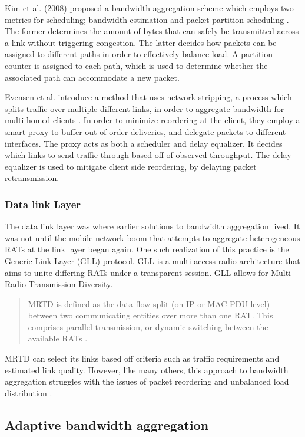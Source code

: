 \documentclass[12pt]{article}
\begin{document}
		Kim et al. (2008) proposed a bandwidth aggregation scheme which employs two metrics for scheduling; bandwidth estimation and packet partition scheduling \cite{kim2008packet}. The former determines the amount of bytes that can safely be transmitted across a link without triggering congestion. The latter decides how packets can be assigned to different paths in order to effectively balance load. A partition counter is assigned to each path, which is used to determine whether the associated path can accommodate a new packet.

		Evensen et al. introduce a method that uses network stripping, a process which splits traffic over multiple different links, in order to aggregate bandwidth for multi-homed clients \cite{5355198}. In order to minimize reordering at the client, they employ a smart proxy to buffer out of order deliveries, and delegate packets to different interfaces. The proxy acts as both a scheduler and delay equalizer. It decides which links to send traffic through based off of observed throughput. The delay equalizer is used to mitigate client side reordering, by delaying packet retransmission.

	\subsubsection{Data link Layer}
		The data link layer was where earlier solutions to bandwidth aggregation lived. It was not until the mobile network boom that attempts to aggregate heterogeneous RATs at the link layer began again. One such realization of this practice is the Generic Link Layer (GLL) protocol. GLL is a multi access radio architecture that aims to unite differing RATs under a transparent session. GLL allows for Multi Radio Transmission Diversity.
		\begin{quote}
			MRTD is defined as the data flow split (on IP or MAC PDU level) between two communicating entities over more than one RAT. This comprises parallel transmission, or dynamic switching between the available RATs \cite{GLL:2005}.
		\end{quote}
		MRTD can select its links based off criteria such as traffic requirements and estimated link quality. However, like many others, this approach to bandwidth aggregation struggles with the issues of packet reordering and unbalanced load distribution \cite{Ramaboli20121674}.

\subsection{Adaptive bandwidth aggregation}
\end{document}
